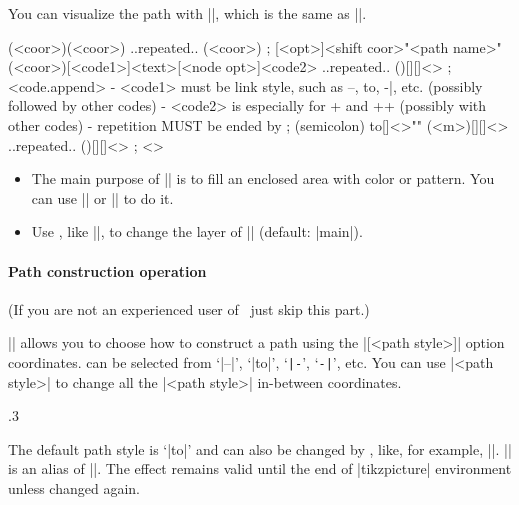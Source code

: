 You can visualize the path with |\tzpath[draw]|, which is the same as |\tzlinks|.


\begin{tzdef}{}
\tzpath (<coor>)(<coor>) ..repeated.. (<coor>) ;
[<opt>]<shift coor>"<path name>"
        (<coor>)[<code1>]{<text>}[<node opt>]<code2>
        ..repeated.. ()[]{}[]<> ; <code.append>
  - <code1> must be link style, such as --, to, -|, etc.
           (possibly followed by other codes)
  - <code2> is especially for + and ++
           (possibly with other codes)
  - repetition MUST be ended by ; (semicolon)
  {to}[]<>"" (<m>)[]{}[]<> ..repeated.. ()[]{}[]<> ; <>
\end{tzdef}

\remark
\begin{itemize}
\item The main purpose of |\tzpath| is to fill an enclosed area with color or pattern.
You can use |\tzpath[fill]| or |\tzpath[pattern=<...>]| to do it.
\item Use \icmd{\settzpathlayer}, like ||, to change the layer of |\tzpath| (default: |main|).
\end{itemize}

\paragraph{Path construction operation}
(If you are not an experienced user of \Tikz\, just skip this part.)

|\tzpath| allows you to choose how to construct a path using the |[<path style>]| option  coordinates.  can be selected from `|--|', `|to|', `\verb+|-+', `\verb+-|+', etc.
You can use  |{<path style>}| to change all the |<path style>| in-between coordinates.


\begin{tzcode}{.3}
\end{tzcode}

The default path style is `|to|' and can also be changed by \icmd{\settzpathstyle}, like, for example, |\settzpathstyle{--}|. |\settzpathstyle| is an alias of |\settzlinkstyle|. The effect remains valid until the end of |tikzpicture| environment unless changed again.

